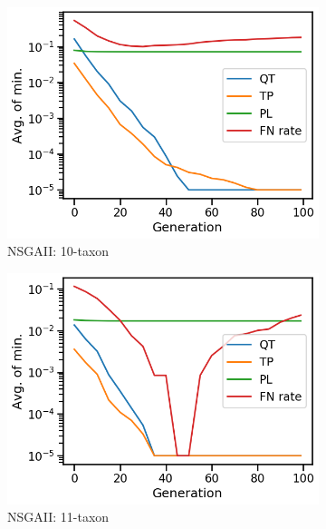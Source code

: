\begin{figure}[!htbp]
	\centering
	\begin{adjustwidth}{-1cm}{-1cm}
		\begin{subfigure}[b]{0.4\textwidth}
			\includegraphics[width=\textwidth]{Figure/10-taxon_NSGAII_minimum}
			\caption{NSGAII: 10-taxon}
		\end{subfigure}%
		\begin{subfigure}[b]{0.4\textwidth}
			\includegraphics[width=\textwidth]{Figure/11-taxon_NSGAII_minimum}
			\caption{NSGAII: 11-taxon}
		\end{subfigure}%
		\begin{subfigure}[b]{0.4\textwidth}

\end{subfigure}
\end{adjustwidth}
\end{figure}
